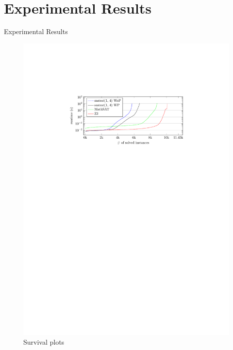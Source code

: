 \documentclass[]{beamer}
\begin{document}
\section{Experimental Results}
\begin{frame}{Experimental Results}
\begin{figure}
    \caption{Survival plots}
    \centering
    \includegraphics[scale=1]{../figures/solved_instances.pdf}
\end{figure}
\end{frame}
\end{document}
